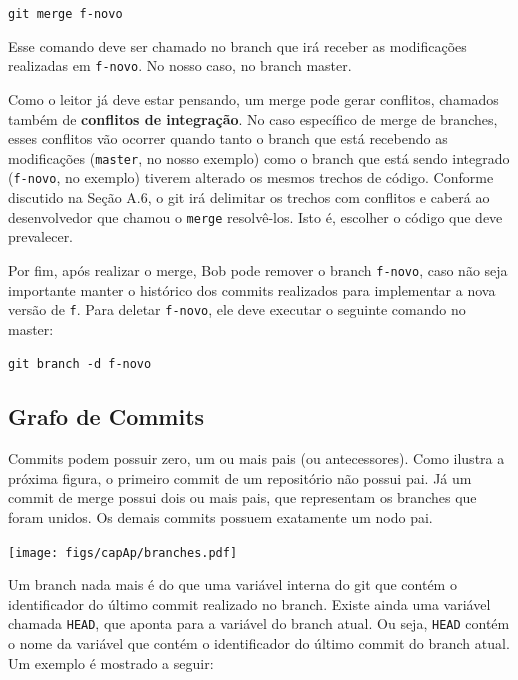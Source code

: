 \documentclass[
  11pt,
  twoside]{book}
\newcommand{\passthrough}[1]{#1}
\begin{document}
\passthrough{\lstinline!git merge f-novo!}

Esse comando deve ser chamado no branch que irá receber as modificações
realizadas em \passthrough{\lstinline!f-novo!}. No nosso caso, no branch
master.

Como o leitor já deve estar pensando, um merge pode gerar conflitos,
chamados também de \textbf{conflitos de integração}. No caso específico
de merge de branches, esses conflitos vão ocorrer quando tanto o branch
que está recebendo as modificações (\passthrough{\lstinline!master!}, no
nosso exemplo) como o branch que está sendo integrado
(\passthrough{\lstinline!f-novo!}, no exemplo) tiverem alterado os
mesmos trechos de código. Conforme discutido na Seção A.6, o git irá
delimitar os trechos com conflitos e caberá ao desenvolvedor que chamou
o \passthrough{\lstinline!merge!} resolvê-los. Isto é, escolher o código
que deve prevalecer.

Por fim, após realizar o merge, Bob pode remover o branch
\passthrough{\lstinline!f-novo!}, caso não seja importante manter o
histórico dos commits realizados para implementar a nova versão de
\passthrough{\lstinline!f!}. Para deletar
\passthrough{\lstinline!f-novo!}, ele deve executar o seguinte comando
no master:

\passthrough{\lstinline!git branch -d f-novo!}

\hypertarget{grafo-de-commits}{%
\subsection{Grafo de Commits}\label{grafo-de-commits}}

 

Commits podem possuir zero, um ou mais pais (ou antecessores). Como
ilustra a próxima figura, o primeiro commit de um repositório não possui
pai. Já um commit de merge possui dois ou mais pais, que representam os
branches que foram unidos. Os demais commits possuem exatamente um nodo
pai.

\texttt{[image: figs/capAp/branches.pdf]}

 Um branch nada mais é do que uma variável interna do
git que contém o identificador do último commit realizado no branch.
Existe ainda uma variável chamada \passthrough{\lstinline!HEAD!}, que
aponta para a variável do branch atual. Ou seja,
\passthrough{\lstinline!HEAD!} contém o nome da variável que contém o
identificador do último commit do branch atual. Um exemplo é mostrado a
seguir:
\end{document}
